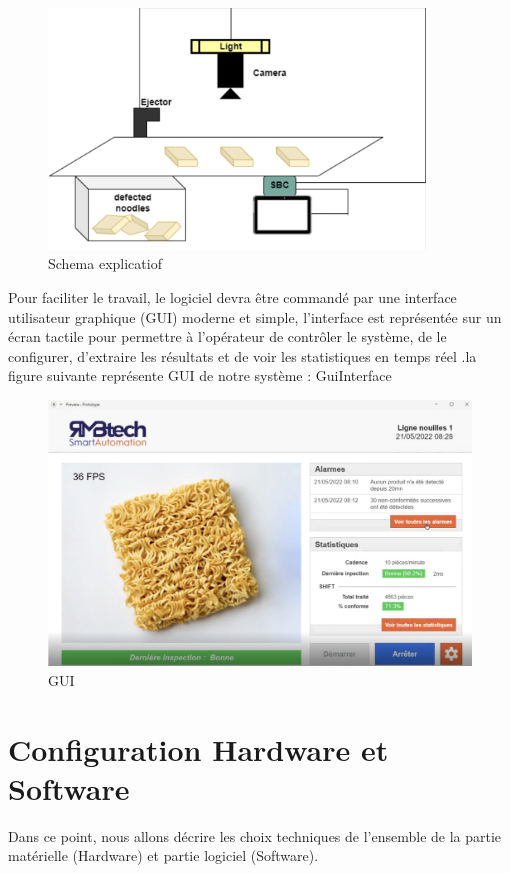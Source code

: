 \begin{figure}[h]
    \centering
    \includegraphics[width=10cm]{assets/PartTwo/Chapterone/ShemaExplicatif.png}
    \caption{Schema explicatiof}
    \label{SchemaArchitecture}
    \end{figure}

Pour faciliter le travail, le logiciel devra être commandé par une interface utilisateur graphique (GUI) moderne et simple, l'interface est représentée sur un écran tactile pour permettre à l'opérateur de contrôler le système, de le configurer, d'extraire les résultats et de voir les statistiques en temps réel .la figure suivante représente GUI de notre système :
GuiInterface 
\begin{figure}[h]
    \centering
    \includegraphics[width=12cm]{assets/PartTwo/ChapterTwo/GuiInterface.png}
    \caption{GUI}
    \label{GUI}
    \end{figure}

\newpage
\section{Configuration Hardware et Software}
Dans ce point, nous allons décrire les choix techniques de l'ensemble de la partie matérielle (Hardware) et partie logiciel (Software). 
